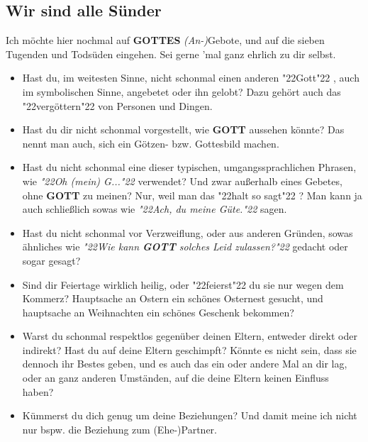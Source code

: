 \documentclass[12pt,a5paper]{article}
\newcommand{\Gottes}[0]{\textbf{GOTTES}}
\newcommand{\Gott}[0]{\textbf{GOTT}}
\newcommand{\q}[1]{\char"22{#1}\char"22 }
\newcommand{\qq}[1]{\textit{\q{#1}}}
\begin{document}
	\subsection{Wir sind alle S\"under}
		Ich m\"ochte hier nochmal auf {\Gottes} \textit{(An-)}Gebote,
		und auf die sieben Tugenden und Tods\"uden eingehen.
		Sei gerne 'mal ganz ehrlich zu dir selbst.
		\\
		\begin{itemize}[nosep]
			\item	Hast du,
					im weitesten Sinne,
					nicht schonmal einen anderen \q{Gott},
					auch im symbolischen Sinne,
					angebetet oder ihn gelobt?
					Dazu geh\"ort auch das \q{verg\"ottern} von Personen und Dingen.
					\\
			\item	Hast du dir nicht schonmal vorgestellt,
					wie {\Gott} aussehen k\"onnte?
					Das nennt man auch,
					sich ein G\"otzen- bzw. Gottesbild machen.
					\\
			\item	Hast du nicht schonmal eine dieser typischen,
					umgangssprachlichen Phrasen,
					wie \qq{Oh (mein) G...} verwendet?
					Und zwar au{\ss}erhalb eines Gebetes,
					ohne {\Gott} zu meinen?
					Nur,
					weil man das \q{halt so sagt}?
					Man kann ja auch schlie{\ss}lich sowas wie
					\qq{Ach, du meine G\"ute.}
					sagen.
					\\
			\item	Hast du nicht schonmal vor Verzweiflung,
					oder aus anderen Gr\"unden,
					sowas \"ahnliches wie
					\qq{Wie kann {\Gott} solches Leid zulassen?}
					gedacht oder sogar gesagt?
					\\
			\item	Sind dir Feiertage wirklich heilig,
					oder \q{feierst} du sie nur wegen dem Kommerz?
					Hauptsache an Ostern ein sch\"ones Osternest gesucht,
					und hauptsache an Weihnachten ein sch\"ones Geschenk bekommen?
					\\
			\item	Warst du schonmal respektlos gegen\"uber deinen Eltern,
					entweder direkt oder indirekt?
					Hast du auf deine Eltern geschimpft?
					K\"onnte es nicht sein,
					dass sie dennoch ihr Bestes geben,
					und es auch das ein oder andere Mal an dir lag,
					oder an ganz anderen Umst\"anden,
					auf die deine Eltern keinen Einfluss haben?
					\\
			\item	K\"ummerst du dich genug um deine Beziehungen?
					Und damit meine ich nicht nur bspw. die Beziehung zum (Ehe-)Partner.

\end{itemize}
\end{document}
